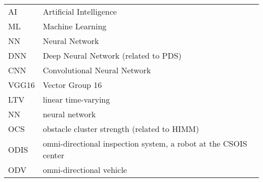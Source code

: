 %
%
%
%

\begin{acronyms}

\renewcommand{\arraystretch}{1.5}
\setlength{\tabcolsep}{3mm}
{\begin {tabular}{ll}
AI & Artificial Intelligence\\
ML &Machine Learning\\
NN &Neural Network\\
DNN &Deep Neural Network (related to PDS)\\
CNN &Convolutional Neural Network\\
VGG16 &Vector Group 16\\
LTV &linear time-varying\\
NN &neural network\\
OCS &obstacle cluster strength (related to HIMM)\\
ODIS &omni-directional inspection system, a robot at the CSOIS center\\
ODV &omni-directional vehicle\\
\end {tabular}}

\end{acronyms}
